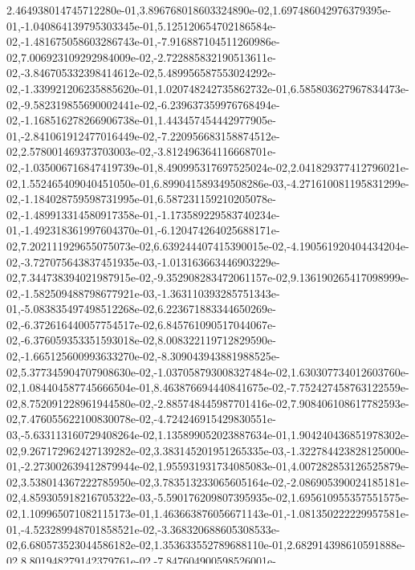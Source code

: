 2.464938014745712280e-01,3.896768018603324890e-02,1.697486042976379395e-01,-1.040864139795303345e-01,5.125120654702186584e-02,-1.481675058603286743e-01,-7.916887104511260986e-02,7.006923109292984009e-02,-2.722885832190513611e-02,-3.846705332398414612e-02,5.489956587553024292e-02,-1.339921206235885620e-01,1.020748242735862732e-01,6.585803627967834473e-02,-9.582319855690002441e-02,-6.239637359976768494e-02,-1.168516278266906738e-01,1.443457454442977905e-01,-2.841061912477016449e-02,-7.220956683158874512e-02,2.578001469373703003e-02,-3.812496364116668701e-02,-1.035006716847419739e-01,8.490995317697525024e-02,2.041829377412796021e-02,1.552465409040451050e-01,6.899041589349508286e-03,-4.271610081195831299e-02,-1.184028759598731995e-01,6.587231159210205078e-02,-1.489913314580917358e-01,-1.173589229583740234e-01,-1.492318361997604370e-01,-6.120474264025688171e-02,7.202111929655075073e-02,6.639244407415390015e-02,-4.190561920404434204e-02,-3.727075643837451935e-03,-1.013163663446903229e-02,7.344738394021987915e-02,-9.352908283472061157e-02,9.136190265417098999e-02,-1.582509488798677921e-03,-1.363110393285751343e-01,-5.083835497498512268e-02,6.223671883344650269e-02,-6.372616440057754517e-02,6.845761090517044067e-02,-6.376059353351593018e-02,8.008322119712829590e-02,-1.665125600993633270e-02,-8.309043943881988525e-02,5.377345904707908630e-02,-1.037058793008327484e-02,1.630307734012603760e-02,1.084404587745666504e-01,8.463876694440841675e-02,-7.752427458763122559e-02,8.752091228961944580e-02,-2.885748445987701416e-02,7.908406108617782593e-02,7.476055622100830078e-02,-4.724246915429830551e-03,-5.633113160729408264e-02,1.135899052023887634e-01,1.904240436851978302e-02,9.267172962427139282e-02,3.383145201951265335e-03,-1.322784423828125000e-01,-2.273002639412879944e-02,1.955931931734085083e-01,4.007282853126525879e-02,3.538014367222785950e-02,3.783513233065605164e-02,-2.086905390024185181e-02,4.859305918216705322e-03,-5.590176209807395935e-02,1.695610955357551575e-02,1.109965071082115173e-01,1.463663876056671143e-01,-1.081350222229957581e-01,-4.523289948701858521e-02,-3.368320688605308533e-02,6.680573523044586182e-02,1.353633552789688110e-01,2.682914398610591888e-02,8.801948279142379761e-02,-7.847604900598526001e-02,-8.868847042322158813e-02,-1.674297600984573364e-01,-4.788946732878684998e-02,-6.422594934701919556e-02,1.013070270419120789e-01,1.460111737251281738e-01,1.210401728749275208e-01,1.505063921213150024e-01,7.681965827941894531e-02,2.971484698355197906e-02,9.832435846328735352e-02,-4.868186637759208679e-02,3.967742249369621277e-02,1.325464099645614624e-01,-1.374977529048919678e-01,-2.172069624066352844e-02,-9.237579256296157837e-02,-2.227885276079177856e-02,-4.177992790937423706e-02,-6.738872826099395752e-02,-3.348537161946296692e-02,4.156820103526115417e-02,8.528742939233779907e-02,6.070287525653839111e-02,2.526137232780456543e-02,-8.363778889179229736e-02,1.227930113673210144e-01,-8.456116914749145508e-02,-1.525231897830963135e-01,-1.236040517687797546e-01,6.959591060876846313e-02,-6.427600048482418060e-03,1.923262774944305420e-01,1.464362889528274536e-01,-7.168121635913848877e-02,1.130924075841903687e-01,-6.853862106800079346e-02,3.476400161162018776e-03,6.973833590745925903e-02,7.318142888834699988e-05
